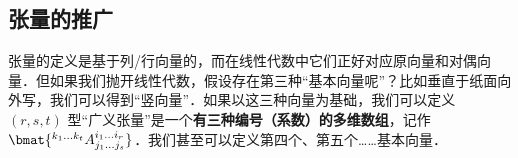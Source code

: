 

\subsection{张量的推广}

张量的定义是基于列/行向量的，而在线性代数中它们正好对应原向量和对偶向量．但如果我们抛开线性代数，假设存在第三种“基本向量呢”？比如垂直于纸面向外写，我们可以得到“竖向量”．如果以这三种向量为基础，我们可以定义 $(r, s, t)$ 型“广义张量”是一个\textbf{有三种编号（系数）的多维数组}，记作 $\bmat{{}^{k_1 \dots k_t}A_{j_1 \dots j_s}^{i_1 \dots i_r}}$．我们甚至可以定义第四个、第五个……基本向量．
